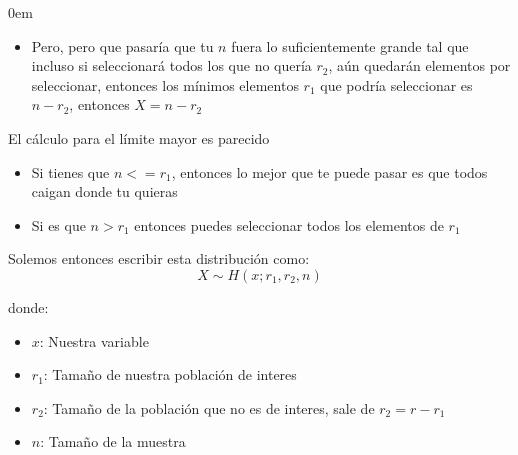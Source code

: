 \documentclass[12pt, fleqn]{report}                             %
\newenvironment{SmallIndentation}[1][0.75em]                    %
        {\begin{adjustwidth}{#1}{}\begin{footnotesize}}             %
        {\end{footnotesize}\end{adjustwidth}}                       %
\theoremstyle{break}                                            %
\begin{document}
\begin{multicols}{2}
\begin{SmallIndentation}[0em]
\begin{itemize}
                                \item
                                    Pero, pero que pasaría que tu $n$ fuera lo suficientemente grande tal que
                                    incluso si seleccionará todos los que no quería $r_2$, aún quedarán elementos
                                    por seleccionar, entonces los mínimos elementos $r_1$ que podría seleccionar 
                                    es $n - r_2$, entonces $X = n - r_2$ 

                            \end{itemize}

                            El cálculo para el límite mayor es parecido
                            \begin{itemize}
                                \item 
                                    Si tienes que $n <= r_1$, entonces lo mejor que te puede pasar es que todos
                                    caigan donde tu quieras
                                \item
                                    Si es que $n > r_1$ entonces puedes seleccionar todos los elementos de $r_1$
                            \end{itemize}

                            Solemos entonces escribir esta distribución como:
                            \begin{equation*}
                                X \sim H(x; r_1, r_2, n)
                            \end{equation*}

                            donde:
                            \begin{itemize}
                                \item $x$: Nuestra variable
                                \item $r_1$: Tamaño de nuestra población de interes
                                \item $r_2$: Tamaño de la población que no es de interes, sale de $r_2 = r - r_1$
                                \item $n$: Tamaño de la muestra
                            \end{itemize}





\end{SmallIndentation}
\end{multicols}
\end{document}
